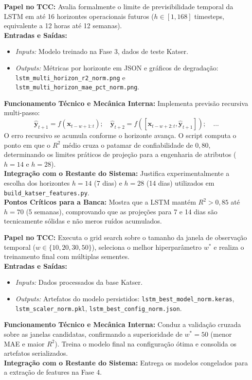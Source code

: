 \documentclass[10pt,a4paper]{article}
\begin{document}
\begin{filebox}
\textbf{Papel no TCC:} Avalia formalmente o limite de previsibilidade temporal da LSTM em até 16 horizontes operacionais futuros ($h \in [1, 168]$ timesteps, equivalente a 12 horas até 12 semanas).\\
\textbf{Entradas e Saídas:}
\begin{itemize}[leftmargin=*,itemsep=1pt]
  \item \textit{Inputs:} Modelo treinado na Fase 3, dados de teste Katser.
  \item \textit{Outputs:} Métricas por horizonte em JSON e gráficos de degradação: \texttt{lstm\_multi\_horizon\_r2\_norm.png} e \texttt{lstm\_multi\_horizon\_mae\_pct\_norm.png}.
\end{itemize}
\textbf{Funcionamento Técnico e Mecânica Interna:} Implementa previsão recursiva multi-passo:
$$\hat{\mathbf{y}}_{t+1} = f(\mathbf{x}_{t-w+1:t}); \quad \hat{\mathbf{y}}_{t+2} = f([\mathbf{x}_{t-w+2:t}, \hat{\mathbf{y}}_{t+1}]); \quad \dots$$
O erro recursivo se acumula conforme o horizonte avança. O script computa o ponto em que o $R^2$ médio cruza o patamar de confiabilidade de $0,80$, determinando os limites práticos de projeção para a engenharia de atributos ($h=14$ e $h=28$).\\
\textbf{Integração com o Restante do Sistema:} Justifica experimentalmente a escolha dos horizontes $h=14$ (7 dias) e $h=28$ (14 dias) utilizados em \texttt{build\_katser\_features.py}.\\
\textbf{Pontos Críticos para a Banca:} Mostra que a LSTM mantém $R^2 > 0,85$ até $h=70$ (5 semanas), comprovando que as projeções para 7 e 14 dias são tecnicamente sólidas e não meros ruídos acumulados.
\end{filebox}

\begin{filebox}
\textbf{Papel no TCC:} Executa o grid search sobre o tamanho da janela de observação temporal ($w \in \{10, 20, 30, 50\}$), seleciona o melhor hiperparâmetro $w^*$ e realiza o treinamento final com múltiplas sementes.\\
\textbf{Entradas e Saídas:}
\begin{itemize}[leftmargin=*,itemsep=1pt]
  \item \textit{Inputs:} Dados processados da base Katser.
  \item \textit{Outputs:} Artefatos do modelo persistidos: \texttt{lstm\_best\_model\_norm.keras}, \texttt{lstm\_scaler\_norm.pkl}, \texttt{lstm\_best\_config\_norm.json}.
\end{itemize}
\textbf{Funcionamento Técnico e Mecânica Interna:} Conduz a validação cruzada sobre as janelas candidatas, confirmando a superioridade de $w^*=50$ (menor MAE e maior $R^2$). Treina o modelo final na configuração ótima e consolida os artefatos serializados.\\
\textbf{Integração com o Restante do Sistema:} Entrega os modelos congelados para a extração de features na Fase 4.
\end{filebox}
\end{document}
